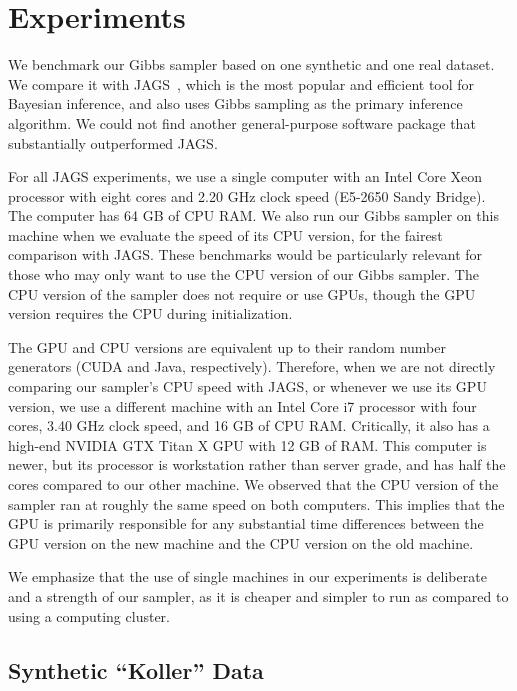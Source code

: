 \documentclass{article} %
\begin{document}
\section{Experiments}\label{sec:experiments}

We benchmark our Gibbs sampler based on one synthetic and one real dataset. We compare it with
JAGS~\citep{JAGS2003}, which is the most popular and efficient tool for Bayesian inference, and also
uses Gibbs sampling as the primary inference algorithm. We could not find another general-purpose
software package that substantially outperformed JAGS. %

For all JAGS experiments, we use a single computer with an Intel Core Xeon processor with eight
cores and 2.20 GHz clock speed (E5-2650 Sandy Bridge). The computer has 64 GB of CPU RAM. We also
run our Gibbs sampler on this machine when we evaluate the speed of its CPU version, for the fairest
comparison with JAGS. These benchmarks would be particularly relevant for those who may only want to
use the CPU version of our Gibbs sampler. The CPU version of the sampler does not require or use
GPUs, though the GPU version requires the CPU during initialization.

The GPU and CPU versions are equivalent up to their random number generators (CUDA and Java,
respectively). Therefore, when we are not directly comparing our sampler's CPU speed with JAGS, or
whenever we use its GPU version, we use a different machine with an Intel Core i7 processor with
four cores, 3.40 GHz clock speed, and 16 GB of CPU RAM. Critically, it also has a high-end NVIDIA
GTX Titan X GPU with 12 GB of RAM.  This computer is newer, but its processor is workstation rather
than server grade, and has half the cores compared to our other machine. We observed that the CPU
version of the sampler ran at roughly the same speed on both computers. This implies that the GPU is
primarily responsible for any substantial time differences between the GPU version on the new
machine and the CPU version on the old machine.

We emphasize that the use of single machines in our experiments is deliberate and a strength of our
sampler, as it is cheaper and simpler to run as compared to using a computing cluster.

\subsection{Synthetic ``Koller'' Data}\label{ssec:koller_data}
\end{document}

